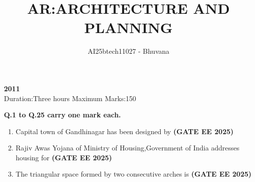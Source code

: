 \documentclass[journal,12pt,onecolumn]{IEEEtran}
\theoremstyle{remark}
\begin{document}
\title{AR:ARCHITECTURE AND PLANNING}
\large \author{AI25btech11027 - Bhuvana}
\maketitle
\renewcommand{\thefigure}{\theenumi}
\renewcommand{\thetable}{\theenumi}
\begin {center}
\large \textbf{2011}\\
{Duration:Three hours \hfill Maximum Marks:150}
\end{center}
{\textbf{Q.1 to Q.25 carry one mark each.}
\begin{enumerate}
    \item Capital town of Gandhinagar has been designed by \hfill \textbf{(GATE EE 2025)}
    \begin{enumerate}
    \end{enumerate}
    \item Rajiv Awas Yojana of Ministry of Housing,Government of India addresses housing for \hfill \textbf{(GATE EE 2025)}
    \begin{enumerate}
    \end{enumerate}
    \item The triangular space formed by two consecutive arches is \hfill \textbf{(GATE EE 2025)}
    \begin{enumerate}

\end{enumerate}
\end{enumerate}}
\end{document}
